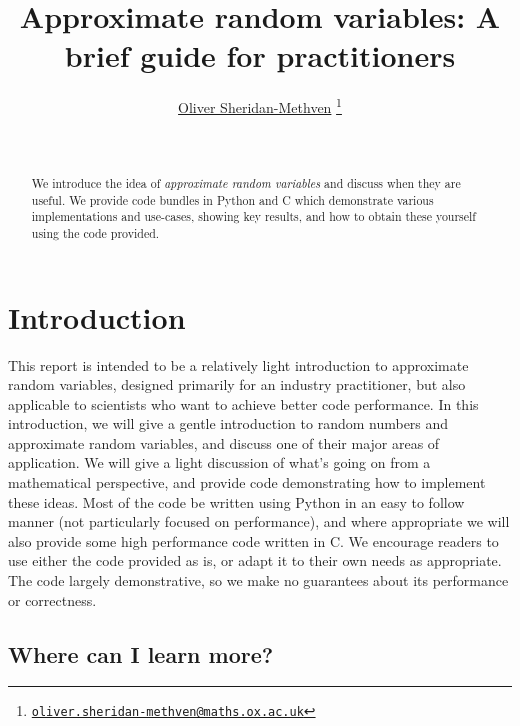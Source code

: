 \documentclass[11pt,a4paper,oneside,english]{extarticle}
\title{Approximate random variables: A brief guide for practitioners}
\author{\href{mailto:oliver.sheridan-methven@maths.ox.ac.uk}{Oliver Sheridan-Methven}%
\thanks{\href{mailto:oliver.sheridan-methven@maths.ox.ac.uk}%
{\texttt{oliver.sheridan-methven@maths.ox.ac.uk}}}}
\date{\datedayname\ \nth{\number\day} \monthname\  \number\year}
\begin{document}
\linenumbers
\maketitle
{}

\begin{abstract}
We introduce the idea of \emph{approximate random variables} and discuss when they are useful. We provide code bundles in Python and C which demonstrate various implementations and use-cases, showing key results, and how to obtain these yourself using the code provided.  
\end{abstract}

\tableofcontents

\section{Introduction}

This report is intended to be a relatively light introduction to approximate random variables, designed primarily for an industry practitioner, but also applicable to scientists who want to achieve better code performance. In this introduction, we will give a gentle introduction to random numbers and approximate random variables, and discuss one of their major areas of application. We will give a light discussion of what's going on from a mathematical perspective, and provide code demonstrating how to implement these ideas. Most of the code be written using Python in an easy to follow manner (not particularly focused on performance), and where appropriate we will also provide some high performance code written in C. We encourage readers to use either the code provided as is, or adapt it to their own needs as appropriate. The code largely demonstrative, so we make no guarantees about its performance or correctness. 

\subsection{Where can I learn more?}
\label{sec:where_can_i_learn_more}
\end{document}
